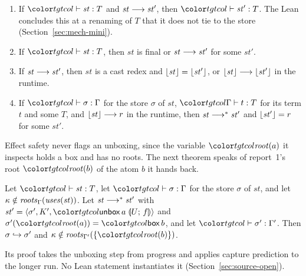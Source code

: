 \begin{theorem}\label{thm:target-meta}
\leavevmode
\begin{enumerate}
\item If $\statej{\mathit{st}}{T}$ and $\mathit{st} \longrightarrow \mathit{st}'$, then $\statej{\mathit{st}'}{T}$. The Lean concludes this at a renaming of $T$ that it does not tie to the store (Section~\ref{sec:mech-mini}).
\item If $\statej{\mathit{st}}{T}$, then $\mathit{st}$ is final or $\mathit{st} \longrightarrow \mathit{st}'$ for some $\mathit{st}'$.
\item If $\mathit{st} \longrightarrow \mathit{st}'$, then $\mathit{st}$ is a cast redex and $\lfloor \mathit{st} \rfloor = \lfloor \mathit{st}' \rfloor$, or $\lfloor \mathit{st} \rfloor \longrightarrow \lfloor \mathit{st}' \rfloor$ in the runtime.
\item If $\storej{\sigma}{\Gamma}$ for the store $\sigma$ of $\mathit{st}$, $\tmj{\Gamma}{t}{T}$ for its term $t$ and some $T$, and $\lfloor \mathit{st} \rfloor \longrightarrow r$ in the runtime, then $\mathit{st} \longrightarrow^{*} \mathit{st}'$ and $\lfloor \mathit{st}' \rfloor = r$ for some $\mathit{st}'$.
\end{enumerate}
\end{theorem}

Effect safety never flags an unboxing, since the variable $\rt{a}$ it inspects holds a box and has no roots. The next theorem speaks of report~1's root $\rt{b}$ of the atom $b$ it hands back.

\begin{theorem}\label{thm:target-unbox}
Let $\statej{\mathit{st}}{T}$, let $\storej{\sigma}{\Gamma}$ for the store $\sigma$ of $\mathit{st}$, and let $\kappa \notin \mathit{roots}_{\Gamma}(\mathit{uses}(\mathit{st}))$. Let $\mathit{st} \longrightarrow^{*} \mathit{st}'$ with $\mathit{st}' = \mst{\sigma'}{K'}{\unboxc{a}{U}{f}}$ and $\sigma'(\rt{a}) = \ev{box}\,b$, and let $\storej{\sigma'}{\Gamma'}$. Then $\sigma \hookrightarrow \sigma'$ and $\kappa \notin \roots{\Gamma'}{\cset{\rt{b}}}$.
\end{theorem}

Its proof takes the unboxing step from progress and applies capture prediction to the longer run. No Lean statement instantiates it (Section~\ref{sec:source-open}).
